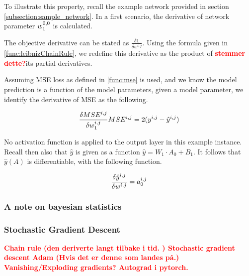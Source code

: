 To illustrate this property, recall the example network provided in section \ref{subsection:sample_network}. 
In a first scenario, the derivative of network parameter $ w_1^{0,\space 0} $ is calculated.

The objective derivative can be stated as $ \frac{\delta \mathbb{L}}{\delta w^{i, j}} $.
Using the formula given in \ref{func:leibnizChainRule}, we redefine this derivative as the product of \textcolor{red}{\textbf{stemmer dette?}}its partial derivatives.







Assuming MSE loss as defined in \ref{func:mse} is used, and we know the model prediction is a function of the model parameters, 
given a model parameter, we identify the derivative of MSE as the following.


\[
    \frac{\delta MSE^{i, j}}{\delta w_1^{i, \space j}} MSE^{i, j} = 2(y^{i, j} - \hat{y}^{i, j})
\]


No activation function is applied to the output layer in this example instance. Recall then also that $ \hat{y} $ is given as a function $ \hat{y} = W_1 \cdot A_0 + B_1 $. 
It follows that $ \hat{y}(A) $ is differentiable, with the following function.

\[
    \frac{\delta \hat{y}^{i, j}}{\delta w^{i,\space j}} = a_0^{i, \space j}
\]









\subsubsection{A note on bayesian statistics}



\subsubsection{Stochastic Gradient Descent}










\textcolor{red}{\textbf{
    Chain rule (den deriverte langt tilbake i tid. )
    Stochastic gradient descent
    Adam (Hvis det er denne som landes på.)
    Vanishing/Exploding gradients?
    Autograd i pytorch.
}}








